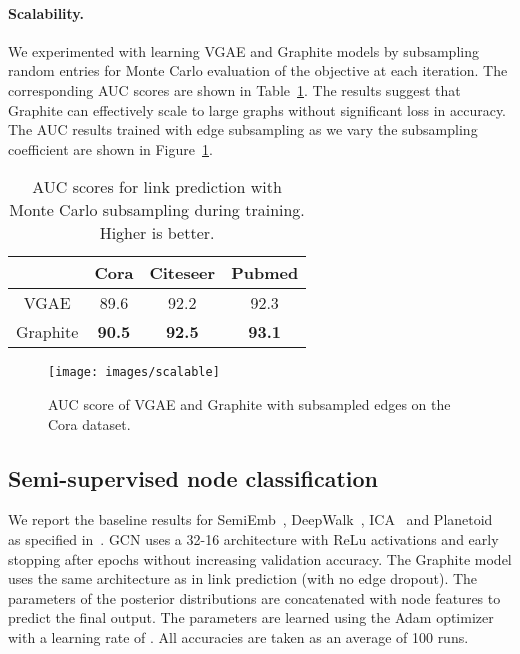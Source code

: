 \documentclass{article}
\newcommand{\name}{Graphite}
\begin{document}
\paragraph{Scalability.} We experimented with learning VGAE and \name{} models by subsampling  random entries for Monte Carlo evaluation of the objective at each iteration. The corresponding AUC scores are shown in Table~\ref{table-scale}. The results suggest that \name{} can effectively scale to large graphs without significant loss in accuracy. 
The AUC results trained with edge subsampling as we vary the subsampling coefficient  are shown in Figure~\ref{fig:scalability}.


\begin{table}[t]
\centering
  \caption{AUC scores for link prediction with Monte Carlo subsampling during training. Higher is better.}
  \label{table-scale}
  \vspace{0.05in}
  \centering
  \begin{tabular}{|c|c|c|c|}
    \toprule
	& Cora & Citeseer & Pubmed \\
    \midrule
    VGAE & 89.6 & 92.2 & 92.3\\
    Graphite & \textbf{90.5} & \textbf{92.5} & \textbf{93.1}\\
    \bottomrule
  \end{tabular}
\end{table}

 


\begin{figure}[t]
\centering
\texttt{[image: images/scalable]}
\caption{AUC score of VGAE and Graphite with subsampled edges on the Cora dataset.}\label{fig:scalability} 
\end{figure}

\subsection{Semi-supervised node classification}

We report the baseline results for  SemiEmb~\citep{weston2008embedding},  DeepWalk~\citep{perozzi2014deepwalk}, ICA~\citep{lu2003classification} and  Planetoid~\citep{yang2016embeddings} as specified in~\citep{kipf2016semi}.  GCN uses a 32-16 architecture with ReLu activations and early stopping after  epochs without increasing validation accuracy.  The \name{} model uses the same architecture as in link prediction (with no edge dropout). The parameters of the posterior distributions are concatenated with node features to predict the final output.  The parameters are learned using the Adam optimizer~\citep{kingma2013auto} with a learning rate of . All accuracies are taken as an average of 100 runs.
\end{document}
